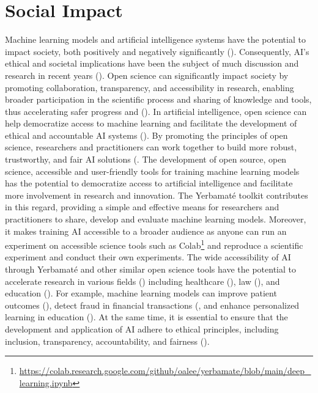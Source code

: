 \documentclass{article}
\begin{document}
\section{Social Impact}
Machine learning models and artificial intelligence systems have the potential to impact society, both positively and negatively significantly (\cite{mittelstadt2019principles, jobin2019global,arrieta2020explainable, floridi2018ai4people}). Consequently, AI's ethical and societal implications have been the subject of much discussion and research in recent years (\cite{floridi2018ai4people, goodman2017european, floridi2019establishing, mittelstadt2016ethics}).
Open science can significantly impact society by promoting collaboration, transparency, and accessibility in research, enabling broader participation in the scientific process and sharing of knowledge and tools, thus accelerating safer progress and (\cite{kocak2022transparency, wachter2017transparent, coro2020open, braun2018open, paton2019open, goodman2017european}). In artificial intelligence, open science can help democratize access to machine learning and facilitate the development of ethical and accountable AI systems (\cite{goodman2017european, batarseh2020data}). By promoting the principles of open science, researchers and practitioners can work together to build more robust, trustworthy, and fair AI solutions (\cite{accountabilityInAi, kocak2022transparency,wachter2017transparent, coro2020open, braun2018open, hicks2021open, goodman2017european}.
The development of open source, open science, accessible and user-friendly tools for training machine learning models has the potential to democratize access to artificial intelligence and facilitate more involvement in research and innovation. The Yerbamaté toolkit contributes in this regard, providing a simple and effective means for researchers and practitioners to share, develop and evaluate machine learning models. Moreover, it makes training AI accessible to a broader audience as anyone can run an experiment on accessible science tools such as Colab\footnote{\url{https://colab.research.google.com/github/oalee/yerbamate/blob/main/deep_learning.ipynb}} and reproduce a scientific experiment and conduct their own experiments.
The wide accessibility of AI through Yerbamaté and other similar open science tools have the potential to accelerate research in various fields (\cite{olson2018system, wolf2020designing,morris2020ai,ong2021guide, li2018can}) including healthcare (\cite{haristiani2020combining}), law (\cite{ashley2017legal}), and education (\cite{goel2020ai}). For example, machine learning models can improve patient outcomes (\cite{hamet2017medicine}), detect fraud in financial transactions (\cite{bao2022fraudartificial}, and enhance personalized learning in education (\cite{haristiani2020combining, goel2020ai}). At the same time, it is essential to ensure that the development and application of AI adhere to ethical principles, including inclusion, transparency, accountability, and fairness (\cite{ accountabilityInAi,  jobin2019global, floridi2018ai4people, wachter2017transparent, arrieta2020explainable, mittelstadt2019principles, goodman2017european, mittelstadt2016ethics, floridi2019establishing, o2017weapons}).
\end{document}
